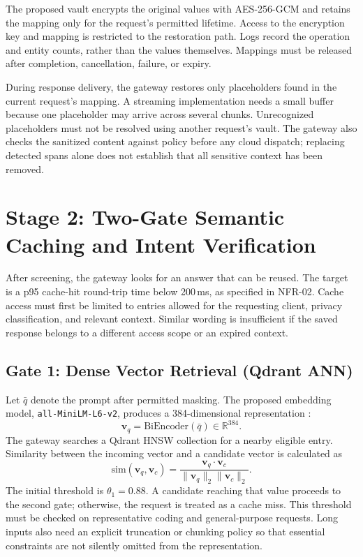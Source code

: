 The proposed vault encrypts the original values with AES-256-GCM and retains the mapping only for the request's permitted lifetime. Access to the encryption key and mapping is restricted to the restoration path. Logs record the operation and entity counts, rather than the values themselves. Mappings must be released after completion, cancellation, failure, or expiry.

During response delivery, the gateway restores only placeholders found in the current request's mapping. A streaming implementation needs a small buffer because one placeholder may arrive across several chunks. Unrecognized placeholders must not be resolved using another request's vault. The gateway also checks the sanitized content against policy before any cloud dispatch; replacing detected spans alone does not establish that all sensitive context has been removed.

\section{Stage 2: Two-Gate Semantic Caching and Intent Verification}
\label{sec:stage2-caching}

After screening, the gateway looks for an answer that can be reused. The target is a p95 cache-hit round-trip time below 200\,ms, as specified in NFR-02. Cache access must first be limited to entries allowed for the requesting client, privacy classification, and relevant context. Similar wording is insufficient if the saved response belongs to a different access scope or an expired context.

\subsection{Gate 1: Dense Vector Retrieval (Qdrant ANN)}

Let $\bar q$ denote the prompt after permitted masking. The proposed embedding model, \texttt{all-MiniLM-L6-v2}, produces a 384-dimensional representation \cite{ref:MiniLMModelCard}:
\begin{equation}
\mathbf{v}_q=\mathrm{BiEncoder}(\bar q)\in\mathbb{R}^{384}.
\end{equation}
The gateway searches a Qdrant HNSW collection for a nearby eligible entry. Similarity between the incoming vector and a candidate vector is calculated as
\begin{equation}
\mathrm{sim}(\mathbf{v}_q,\mathbf{v}_c)=
\frac{\mathbf{v}_q\cdot\mathbf{v}_c}
{\|\mathbf{v}_q\|_2\|\mathbf{v}_c\|_2}.
\end{equation}
The initial threshold is $\theta_1=0.88$. A candidate reaching that value proceeds to the second gate; otherwise, the request is treated as a cache miss. This threshold must be checked on representative coding and general-purpose requests. Long inputs also need an explicit truncation or chunking policy so that essential constraints are not silently omitted from the representation.

